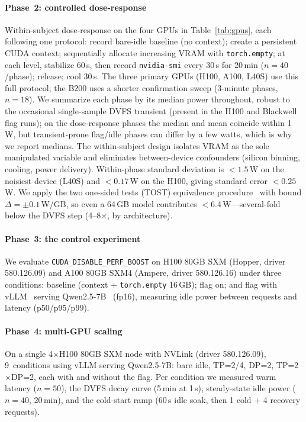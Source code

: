 \documentclass[conference]{IEEEtran}
\newcommand{\perfboost}{\texttt{\mbox{CUDA}\_\hspace{0pt}\mbox{DISABLE}\_\hspace{0pt}\mbox{PERF}\_\hspace{0pt}\mbox{BOOST}}\xspace}
\begin{document}
\paragraph{Phase~2: controlled dose-response}
Within-subject dose-response on the four GPUs in Table~\ref{tab:gpus}, each following one protocol: record bare-idle baseline (no context); create a persistent CUDA context; sequentially allocate increasing VRAM with \texttt{torch.empty}; at each level, stabilize 60\,s, then record \texttt{nvidia-smi} every 30\,s for 20\,min ($n=40$/phase); release; cool 30\,s. The three primary GPUs (H100, A100, L40S) use this full protocol; the B200 uses a shorter confirmation sweep (3-minute phases, $n=18$). We summarize each phase by its median power throughout, robust to the occasional single-sample DVFS transient (present in the H100 and Blackwell flag runs); on the dose-response phases the median and mean coincide within 1\,W, but transient-prone flag/idle phases can differ by a few watts, which is why we report medians. The within-subject design isolates VRAM as the sole manipulated variable and eliminates between-device confounders (silicon binning, cooling, power delivery). Within-phase standard deviation is $<1.5$\,W on the noisiest device (L40S) and $<0.17$\,W on the H100, giving standard error $<0.25$\,W. We apply the two one-sided tests (TOST) equivalence procedure~\cite{schuirmann-tost} with bound $\Delta = \pm 0.1$\,W/GB, so even a 64\,GB model contributes $<6.4$\,W---several-fold below the DVFS step (4--8$\times$, by architecture).

\paragraph{Phase~3: the control experiment}
We evaluate \perfboost on H100 80GB SXM (Hopper, driver 580.126.09) and A100 80GB SXM4 (Ampere, driver 580.126.16) under three conditions: baseline (context + \texttt{torch.empty} 16\,GB); flag on; and flag with vLLM~\cite{vllm} serving Qwen2.5-7B~\cite{qwen2} (fp16), measuring idle power between requests and latency (p50/p95/p99).

\paragraph{Phase~4: multi-GPU scaling}
On a single 4$\times$H100 80GB SXM node with NVLink (driver 580.126.09), 9~conditions using vLLM serving Qwen2.5-7B: bare idle, TP=2/4, DP=2, TP=2$\times$DP=2, each with and without the flag. Per condition we measured warm latency ($n=50$), the DVFS decay curve (5\,min at 1\,s), steady-state idle power ($n=40$, 20\,min), and the cold-start ramp (60\,s idle soak, then 1 cold + 4 recovery requests).
\end{document}
